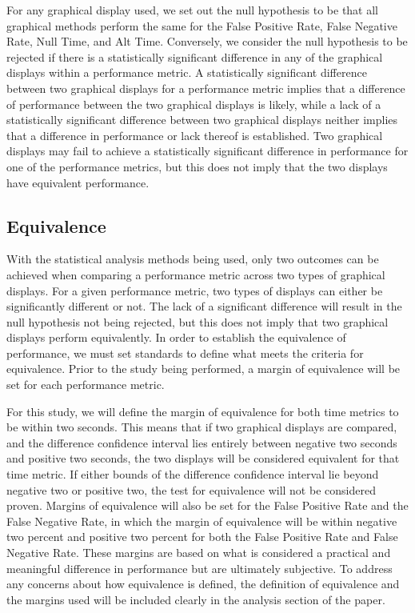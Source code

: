 \documentclass{article}
\begin{document}
For any graphical display used, we set out the null hypothesis to be that all graphical methods perform the same for the False Positive Rate, False Negative Rate, Null Time, and Alt Time. Conversely, we consider the null hypothesis to be rejected if there is a statistically significant difference in any of the graphical displays within a performance metric. A statistically significant difference between two graphical displays for a performance metric implies that a difference of performance between the two graphical displays is likely, while a lack of a statistically significant difference between two graphical displays neither implies that a difference in performance or lack thereof is established. Two graphical displays may fail to achieve a statistically significant difference in performance for one of the performance metrics, but this does not imply that the two displays have equivalent performance.

\subsection{Equivalence}

With the statistical analysis methods being used, only two outcomes can be achieved when comparing a performance metric across two types of graphical displays. For a given performance metric, two types of displays can either be significantly different or not. The lack of a significant difference will result in the null hypothesis not being rejected, but this does not imply that two graphical displays perform equivalently. In order to establish the equivalence of performance, we must set standards to define what meets the criteria for equivalence. Prior to the study being performed, a margin of equivalence will be set for each performance metric.


For this study, we will define the margin of equivalence for both time metrics to be within two seconds. This means that if two graphical displays are compared, and the difference confidence interval lies entirely between negative two seconds and positive two seconds, the two displays will be considered equivalent for that time metric. If either bounds of the difference confidence interval lie beyond negative two or positive two, the test for equivalence will not be considered proven. Margins of equivalence will also be set for the False Positive Rate and the False Negative Rate, in which the margin of equivalence will be within negative two percent and positive two percent for both the False Positive Rate and False Negative Rate. These margins are based on what is considered a practical and meaningful difference in performance but are ultimately subjective. To address any concerns about how equivalence is defined, the definition of equivalence and the margins used will be included clearly in the analysis section of the paper.
\end{document}
